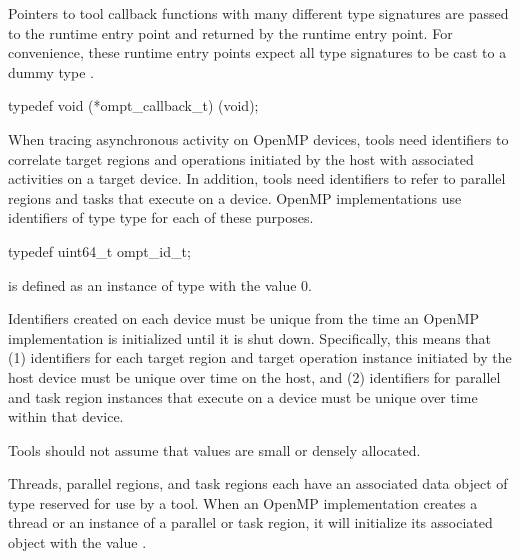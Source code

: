 \label{sec:ompt_callback_t}

Pointers to tool callback functions with many different type
signatures are passed to the  runtime entry point and
returned by the  runtime entry point. For convenience,
these runtime entry points expect all type signatures to be cast to
a dummy type .


\begin{ccppspecific}
\begin{omptCallback}
typedef void (*ompt_callback_t) (void);
\end{omptCallback}
\end{ccppspecific}



\label{sec:ompt_id_t}
When tracing asynchronous activity on OpenMP devices, tools need identifiers to correlate target regions and operations initiated by the host with
associated activities on a target device. In addition, tools need identifiers to refer to parallel regions and tasks that execute on a device.
OpenMP implementations use identifiers of type  type for each of these 
purposes.

\begin{ccppspecific}
\begin{omptOther}
typedef uint64_t ompt_id_t;
\end{omptOther}
\end{ccppspecific}

 is defined as an instance of type  with the value 0.

Identifiers created on each device must be unique from the time an OpenMP implementation is initialized until it is shut down.
Specifically, this means that (1) identifiers for each target region and target operation instance initiated by the host device must be unique over time on the host,
and (2) identifiers for parallel and task region instances that execute on a device must be unique over time within that device.

Tools should not assume that  values are small or densely allocated.


\label{sec:ompt_data_t}
Threads, parallel regions, and task regions
each have an associated data object of type  reserved for use by a tool.
When an OpenMP implementation creates a thread or an instance of a parallel or task region,
it will initialize its associated  object with the value .



